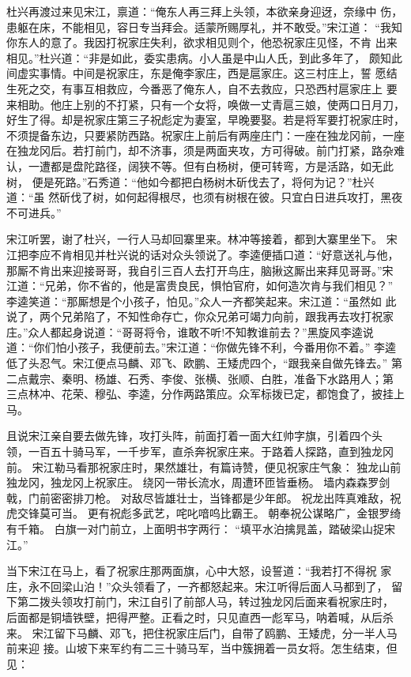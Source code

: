 杜兴再渡过来见宋江，禀道：“俺东人再三拜上头领，本欲亲身迎迓，奈缘中
伤，患躯在床，不能相见，容日专当拜会。适蒙所赐厚礼，并不敢受。”宋江道：
“我知你东人的意了。我因打祝家庄失利，欲求相见则个，他恐祝家庄见怪，不肯
出来相见。”杜兴道：“非是如此，委实患病。小人虽是中山人氏，到此多年了，
颇知此间虚实事情。中间是祝家庄，东是俺李家庄，西是扈家庄。这三村庄上，誓
愿结生死之交，有事互相救应，今番恶了俺东人，自不去救应，只恐西村扈家庄上
要来相助。他庄上别的不打紧，只有一个女将，唤做一丈青扈三娘，使两口日月刀，
好生了得。却是祝家庄第三子祝彪定为妻室，早晚要娶。若是将军要打祝家庄时，
不须提备东边，只要紧防西路。祝家庄上前后有两座庄门：一座在独龙冈前，一座
在独龙冈后。若打前门，却不济事，须是两面夹攻，方可得破。前门打紧，路杂难
认，一遭都是盘陀路径，阔狭不等。但有白杨树，便可转弯，方是活路，如无此树，
便是死路。”石秀道：“他如今都把白杨树木斫伐去了，将何为记？”杜兴道：“虽
然斫伐了树，如何起得根尽，也须有树根在彼。只宜白日进兵攻打，黑夜不可进兵。”

宋江听罢，谢了杜兴，一行人马却回寨里来。林冲等接着，都到大寨里坐下。
宋江把李应不肯相见并杜兴说的话对众头领说了。李逵便插口道：“好意送礼与他，
那厮不肯出来迎接哥哥，我自引三百人去打开鸟庄，脑揪这厮出来拜见哥哥。”宋
江道：“兄弟，你不省的，他是富贵良民，惧怕官府，如何造次肯与我们相见？”
李逵笑道：“那厮想是个小孩子，怕见。”众人一齐都笑起来。宋江道：“虽然如
此说了，两个兄弟陷了，不知性命存亡，你众兄弟可竭力向前，跟我再去攻打祝家
庄。”众人都起身说道：“哥哥将令，谁敢不听!不知教谁前去？”黑旋风李逵说
道：“你们怕小孩子，我便前去。”宋江道：“你做先锋不利，今番用你不着。”
李逵低了头忍气。宋江便点马麟、邓飞、欧鹏、王矮虎四个，“跟我亲自做先锋去。”
第二点戴宗、秦明、杨雄、石秀、李俊、张横、张顺、白胜，准备下水路用人；第
三点林冲、花荣、穆弘、李逵，分作两路策应。众军标拨已定，都饱食了，披挂上
马。

且说宋江亲自要去做先锋，攻打头阵，前面打着一面大红帅字旗，引着四个头
领，一百五十骑马军，一千步军，直杀奔祝家庄来。于路着人探路，直到独龙冈前。
宋江勒马看那祝家庄时，果然雄壮，有篇诗赞，便见祝家庄气象：
独龙山前独龙冈，独龙冈上祝家庄。
绕冈一带长流水，周遭环匝皆垂杨。
墙内森森罗剑戟，门前密密排刀枪。
对敌尽皆雄壮士，当锋都是少年郎。
祝龙出阵真难敌，祝虎交锋莫可当。
更有祝彪多武艺，咤叱喑呜比霸王。
朝奉祝公谋略广，金银罗绮有千箱。
白旗一对门前立，上面明书字两行：
“填平水泊擒晁盖，踏破梁山捉宋江。”

当下宋江在马上，看了祝家庄那两面旗，心中大怒，设誓道：“我若打不得祝
家庄，永不回梁山泊！”众头领看了，一齐都怒起来。宋江听得后面人马都到了，
留下第二拨头领攻打前门，宋江自引了前部人马，转过独龙冈后面来看祝家庄时，
后面都是铜墙铁壁，把得严整。正看之时，只见直西一彪军马，呐着喊，从后杀来。
宋江留下马麟、邓飞，把住祝家庄后门，自带了鸥鹏、王矮虎，分一半人马前来迎
接。山坡下来军约有二三十骑马军，当中簇拥着一员女将。怎生结束，但见：

